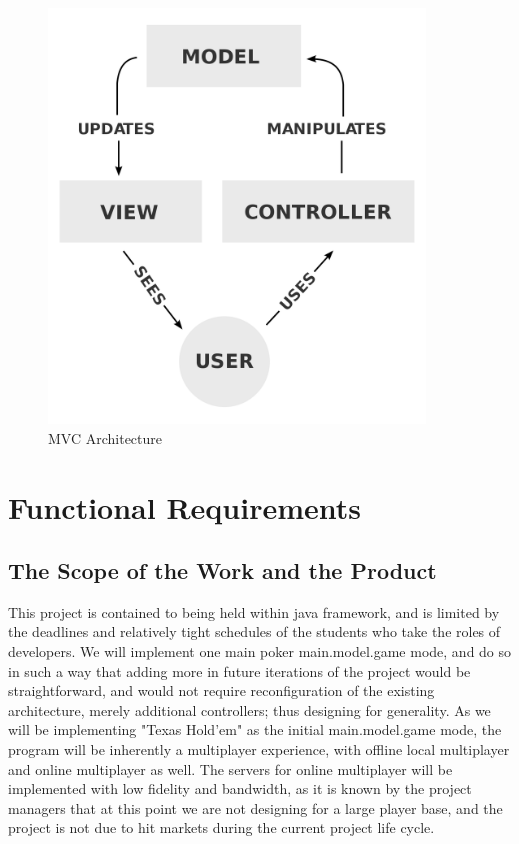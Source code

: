 \documentclass[12pt, titlepage]{article}
\begin{document}
\begin{figure}
    \centering
    \includegraphics[width=10cm]{MVC-Process.svg.png}
    \caption{MVC Architecture}
\end{figure}

\section{Functional Requirements}

\subsection{The Scope of the Work and the Product}
    This project is contained to being held within java framework, and is limited by the deadlines and relatively tight schedules of the students who take the roles of developers. We will implement one main poker main.model.game mode, and do so in such a way that adding more in future iterations of the project would be straightforward, and would not require reconfiguration of the existing architecture, merely additional controllers; thus designing for generality. As we will be implementing "Texas Hold'em" as the initial main.model.game mode, the program will be inherently a multiplayer experience, with offline local multiplayer and online multiplayer as well. The servers for online multiplayer will be implemented with low fidelity and bandwidth, as it is known by the project managers that at this point we are not designing for a large player base, and the project is not due to hit markets during the current project life cycle.
    
\end{document}
